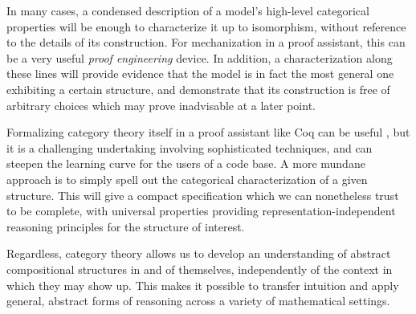 \documentclass[11pt,oneside]{book}
\theoremstyle{definition}
\begin{document}
In many cases,
a condensed description of
a model's high-level categorical properties
will be enough to characterize it
up to isomorphism,
without reference to the details of its construction.
For mechanization in a proof assistant,
this can be a very useful \emph{proof engineering} device.
In addition,
a characterization along these lines
will provide evidence that
the model is in fact the most general one
exhibiting a certain structure,
and demonstrate that its construction is free of arbitrary choices
which may prove inadvisable at a later point.

Formalizing category theory itself
in a proof assistant like Coq
can be useful \citep{math-classes},
but it is a challenging undertaking
involving sophisticated techniques,
and can steepen the learning curve
for the users of a code base.
A more mundane approach
is to simply spell out
the categorical characterization of a given structure.
This will give a compact specification
which we can nonetheless trust to be complete,
with universal properties
providing
representation-independent reasoning principles
for the structure of interest.

Regardless,
category theory allows us
to develop an understanding of abstract compositional structures
in and of themselves,
independently of the context in which they may show up.
This makes it possible to transfer intuition
and apply general, abstract forms of reasoning
across a variety of mathematical settings.
\end{document}
